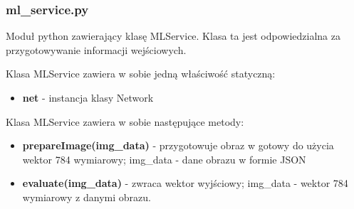 \documentclass{article}
\begin{document}
\subsubsection{ml\_service.py}
Moduł python zawierający klasę MLService. Klasa ta jest odpowiedzialna za przygotowywanie informacji wejściowych.

Klasa MLService zawiera w sobie jedną właściwość statyczną:
\begin{itemize}
    \item \textbf{net} - instancja klasy Network
\end{itemize}

Klasa MLService zawiera w sobie następujące metody:
\begin{itemize}
    \item \textbf{prepareImage(img\_data)} - przygotowuje obraz w gotowy do użycia wektor 784 wymiarowy; img\_data - dane obrazu w formie JSON
    \item \textbf{evaluate(img\_data)} - zwraca wektor wyjściowy; img\_data - wektor 784 wymiarowy z danymi obrazu.
\end{itemize}


\pagebreak

\pagebreak

\pagebreak

\pagebreak

\pagebreak

\pagebreak

\pagebreak

\pagebreak

\pagebreak

\end{document}
